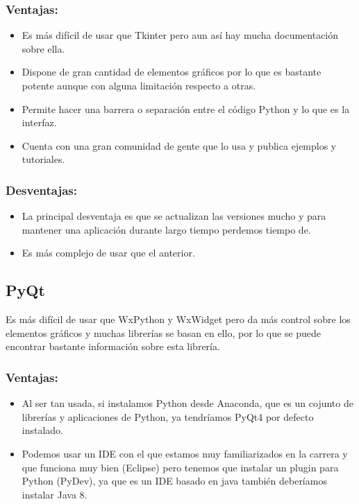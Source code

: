 \subsubsection{Ventajas:}
\begin{itemize}
\item Es más difícil de usar que Tkinter pero aun así hay mucha documentación sobre ella.

\item Dispone de gran cantidad de elementos gráficos por lo que es bastante potente aunque con alguna limitación respecto a otras.

\item Permite hacer una barrera o separación entre el código Python y lo que es la interfaz.
\item Cuenta con una gran comunidad de gente que lo usa y publica ejemplos y tutoriales.
\end{itemize}

\subsubsection{Desventajas:}
\begin{itemize}
\item La principal desventaja es que se actualizan las versiones mucho y para mantener una aplicación durante largo tiempo perdemos tiempo de.
\item Es más complejo de usar que el anterior.
\end{itemize}

\subsection{PyQt}
Es más difícil de usar que WxPython y WxWidget pero da más control sobre los elementos gráficos y muchas librerías se basan en ello, por lo que se puede encontrar bastante información sobre esta librería.
\\

\subsubsection{Ventajas:}

\begin{itemize}
\item Al ser tan usada, si instalamos Python desde Anaconda, que es un cojunto de librerías y aplicaciones de Python, ya tendríamos PyQt4 por defecto instalado.

\item Podemos usar un IDE con el que estamos muy familiarizados en la carrera y que funciona muy bien (Eclipse) pero tenemos que instalar un plugin para Python (PyDev), ya que es un IDE basado en java también deberíamos instalar Java 8.
\end{itemize}

